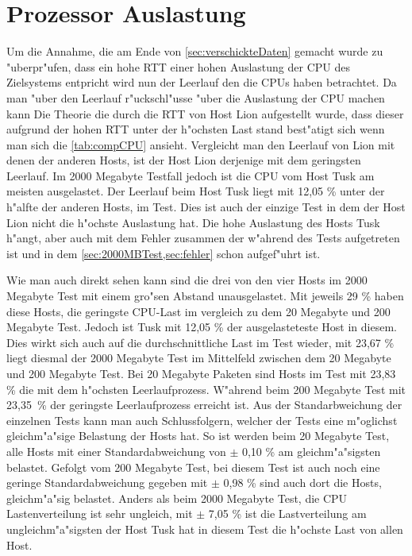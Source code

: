 \section{Prozessor Auslastung}
\label{sec:cpulast}
Um die Annahme, die am Ende von \cref{sec:verschickteDaten} gemacht wurde zu "uberpr"ufen, dass %
ein hohe RTT einer hohen Auslastung der CPU des Zielsystems entpricht wird nun der Leerlauf den %
die CPUs haben betrachtet. Da man "uber den Leerlauf r"uckschl"usse "uber die Auslastung der CPU machen kann %
Die Theorie die durch die RTT von Host Lion aufgestellt wurde, dass dieser aufgrund der hohen RTT %
unter der h"ochsten Last stand best"atigt sich wenn man sich die \cref{tab:compCPU} ansieht. %
Vergleicht man den Leerlauf von Lion mit denen der anderen Hosts, ist der Host Lion derjenige mit %
dem geringsten Leerlauf. Im 2000 Megabyte Testfall jedoch ist die CPU vom Host Tusk am meisten %
ausgelastet. Der Leerlauf beim Host Tusk liegt mit 12,05 \% unter der h"alfte der anderen Hosts, im Test. %
Dies ist auch der einzige Test in dem der Host Lion nicht die h"ochste Auslastung hat. Die hohe Auslastung %
des Hosts Tusk h"angt, aber auch mit dem Fehler zusammen der w"ahrend des Tests aufgetreten ist und in dem %
\cref{sec:2000MBTest,sec:fehler} schon aufgef"uhrt ist. %

Wie man auch direkt sehen kann sind die drei von den vier Hosts im 2000 Megabyte Test mit einem gro"sen Abstand %
unausgelastet. Mit jeweils 29 \% haben diese Hosts, die geringste CPU-Last im vergleich zu dem 20 Megabyte und %
200 Megabyte Test. Jedoch ist Tusk mit 12,05 \% der ausgelasteteste Host in diesem. Dies wirkt sich auch auf die %
durchschnittliche Last im Test wieder, mit 23,67 \% liegt diesmal der 2000 Megabyte Test im Mittelfeld zwischen %
dem 20 Megabyte und 200 Megabyte Test. Bei 20 Megabyte Paketen sind Hosts im Test mit 23,83 \% die mit dem %
h"ochsten Leerlaufprozess. W"ahrend beim 200 Megabyte Test mit \mbox{23,35 \%} der geringste Leerlaufprozess erreicht %
ist. Aus der Standarbweichung der einzelnen Tests kann man auch Schlussfolgern, welcher der Tests eine m"oglichst %
gleichm"a"sige Belastung der Hosts hat. So ist werden beim 20 Megabyte Test, alle Hosts mit einer Standardabweichung %
von $\pm$ 0,10 \% am gleichm"a"sigsten belastet. Gefolgt vom 200 Megabyte Test, bei diesem Test ist auch noch eine %
geringe Standardabweichung gegeben mit $\pm$ 0,98 \% sind auch dort die Hosts, gleichm"a"sig belastet. %
Anders als beim 2000 Megabyte Test, die CPU Lastenverteilung ist sehr ungleich, mit $\pm$ 7,05 \% ist die Lastverteilung %
am ungleichm"a"sigsten der Host Tusk hat in diesem Test die h"ochste Last von allen Host. %



